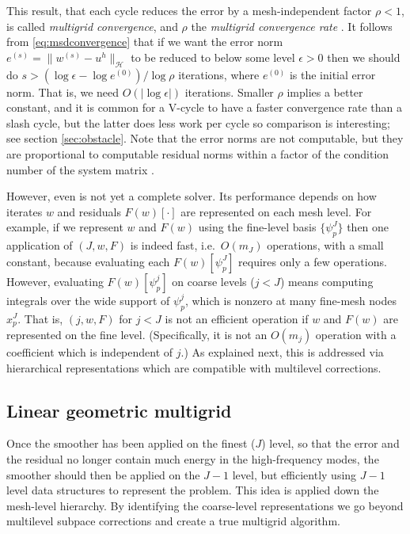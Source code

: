 \documentclass[letterpaper,final,12pt,reqno]{amsart}
\theoremstyle{claim}
\newcommand{\eps}{\epsilon}
\numberwithin{equation}{section}
\numberwithin{figure}{section}
\numberwithin{table}{section}
\numberwithin{theorem}{section}
\begin{document}
This result, that each cycle reduces the error by a mesh-independent factor $\rho<1$, is called \emph{multigrid convergence}, and $\rho$ the \emph{multigrid convergence rate} \cite{Braess2007}.  It follows from \eqref{eq:msdconvergence} that if we want the error norm $e^{(s)} = \|w^{(s)}-u^h\|_{\mathcal{H}}$ to be reduced to below some level $\eps>0$ then we should do $s>(\log\eps - \log e^{(0)})/\log \rho$ iterations, where $e^{(0)}$ is the initial error norm.  That is, we need $O(|\log\eps|)$ iterations.  Smaller $\rho$ implies a better constant, and it is common for a V-cycle to have a faster convergence rate than a slash cycle, but the latter does less work per cycle so comparison is interesting; see section \ref{sec:obstacle}.  Note that the error norms are not computable, but they are proportional to computable residual norms within a factor of the condition number of the system matrix \cite[Chapter 2]{Bueler2016}.

However, even  is not yet a complete solver.  Its performance depends on how iterates $w$ and residuals $F(w)[\cdot]$ are represented on each mesh level.  For example, if we represent $w$ and $F(w)$ using the fine-level basis $\{\psi_p^J\}$ then one application of $(J,w,F)$ is indeed fast, i.e.~$O(m_J)$ operations, with a small constant, because evaluating each $F(w)[\psi_p^J]$ requires only a few operations.  However, evaluating $F(w)[\psi_p^j]$ on coarse levels ($j<J$) means computing integrals over the wide support of $\psi_p^j$, which is nonzero at many fine-mesh nodes $x_p^J$.  That is, $(j,w,F)$ for $j<J$ is not an efficient operation if $w$ and $F(w)$ are represented on the fine level.  (Specifically, it is not an $O(m_j)$ operation with a coefficient which is independent of $j$.)  As explained next, this is addressed via hierarchical representations which are compatible with multilevel corrections.

\subsection*{Linear geometric multigrid}  Once the smoother has been applied on the finest ($J$) level, so that the error and the residual no longer contain much energy in the high-frequency modes, the smoother should then be applied on the $J-1$ level, but efficiently using $J-1$ level data structures to represent the problem.  This idea is applied down the mesh-level hierarchy.  By identifying the coarse-level representations we go beyond multilevel subpace corrections and create a true multigrid algorithm.
\end{document}
